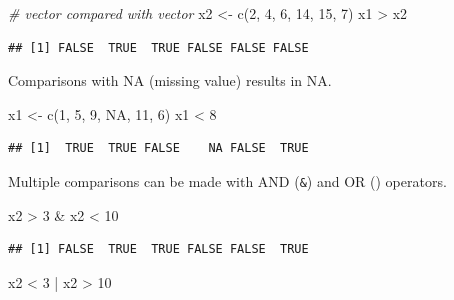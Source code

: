 \documentclass[
]{book}
\newenvironment{Shaded}{\begin{snugshade}}{\end{snugshade}}
\newcommand{\CommentTok}[1]{\textcolor[rgb]{0.56,0.35,0.01}{\textit{#1}}}
\newcommand{\ConstantTok}[1]{\textcolor[rgb]{0.00,0.00,0.00}{#1}}
\newcommand{\DecValTok}[1]{\textcolor[rgb]{0.00,0.00,0.81}{#1}}
\newcommand{\FunctionTok}[1]{\textcolor[rgb]{0.00,0.00,0.00}{#1}}
\newcommand{\NormalTok}[1]{#1}
\newcommand{\OtherTok}[1]{\textcolor[rgb]{0.56,0.35,0.01}{#1}}
\newcommand{\SpecialCharTok}[1]{\textcolor[rgb]{0.00,0.00,0.00}{#1}}
\begin{document}
\begin{Shaded}
\begin{Highlighting}[]
\CommentTok{\# vector compared with vector}
\NormalTok{x2 }\OtherTok{\textless{}{-}} \FunctionTok{c}\NormalTok{(}\DecValTok{2}\NormalTok{, }\DecValTok{4}\NormalTok{, }\DecValTok{6}\NormalTok{, }\DecValTok{14}\NormalTok{, }\DecValTok{15}\NormalTok{, }\DecValTok{7}\NormalTok{)}
\NormalTok{x1 }\SpecialCharTok{\textgreater{}}\NormalTok{ x2}
\end{Highlighting}
\end{Shaded}

\begin{verbatim}
## [1] FALSE  TRUE  TRUE FALSE FALSE FALSE
\end{verbatim}

Comparisons with NA (missing value) results in NA.

\begin{Shaded}
\begin{Highlighting}[]
\NormalTok{x1 }\OtherTok{\textless{}{-}} \FunctionTok{c}\NormalTok{(}\DecValTok{1}\NormalTok{, }\DecValTok{5}\NormalTok{, }\DecValTok{9}\NormalTok{, }\ConstantTok{NA}\NormalTok{, }\DecValTok{11}\NormalTok{, }\DecValTok{6}\NormalTok{)}
\NormalTok{x1 }\SpecialCharTok{\textless{}} \DecValTok{8}
\end{Highlighting}
\end{Shaded}

\begin{verbatim}
## [1]  TRUE  TRUE FALSE    NA FALSE  TRUE
\end{verbatim}

Multiple comparisons can be made with AND (\texttt{\&}) and OR (\texttt{\textbar{}}) operators.

\begin{Shaded}
\begin{Highlighting}[]
\NormalTok{x2 }\SpecialCharTok{\textgreater{}} \DecValTok{3} \SpecialCharTok{\&}\NormalTok{ x2 }\SpecialCharTok{\textless{}} \DecValTok{10}
\end{Highlighting}
\end{Shaded}

\begin{verbatim}
## [1] FALSE  TRUE  TRUE FALSE FALSE  TRUE
\end{verbatim}

\begin{Shaded}
\begin{Highlighting}[]
\NormalTok{x2 }\SpecialCharTok{\textless{}} \DecValTok{3} \SpecialCharTok{|}\NormalTok{ x2 }\SpecialCharTok{\textgreater{}} \DecValTok{10}
\end{Highlighting}
\end{Shaded}
\end{document}
